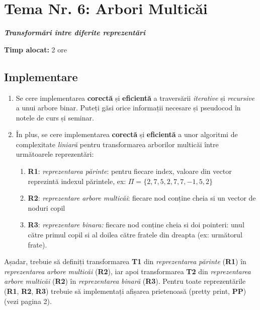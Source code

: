 \documentclass[../ro-fa-lab.tex]{subfiles}
\begin{document}
\section{\texorpdfstring{\textbf{Tema Nr. 6: Arbori Multicăi}}{Tema Nr. 6: Arbori Multicăi}}\label{assign6}


\emph{\textbf{Transformări între diferite reprezentări}}

\textbf{Timp alocat:} 2 ore

\subsection{Implementare}\label{implementare}

\begin{enumerate}
\def\labelenumi{\arabic{enumi}.}
\item
  Se cere implementarea \textbf{corectă} și \textbf{eficientă} a
  traversării \emph{iterative} și \emph{recursive} a unui arbore binar.
  Puteți găsi orice informații necesare și pseudocod în notele de curs
  și seminar.
\item
  În plus, se cere implementarea \textbf{corectă} și \textbf{eficientă}
  a unor algoritmi de complexitate \emph{liniară} pentru transformarea
  arborilor multicăi între următoarele reprezentări:

  \begin{enumerate}
  \def\labelenumii{\arabic{enumii}.}
  \item
    \textbf{R1}: \emph{reprezentarea părinte}: pentru fiecare index,
    valoare din vector reprezintă indexul părintele, ex:
    \(\Pi = \{ 2,7,5,2,7,7, - 1,5,2\}\)
  \item
    \textbf{R2}: \emph{reprezentare arbore multicăi}: fiecare nod
    conține cheia si un vector de noduri copil
  \item
    \textbf{R3}: \emph{reprezentare binara:} fiecare nod conține cheia
    si doi pointeri: unul către primul copil si al doilea către fratele
    din dreapta (ex: următorul frate).
  \end{enumerate}
\end{enumerate}

Așadar, trebuie să definiți transformarea \textbf{T1} din
\emph{reprezentarea} \emph{părinte} (\textbf{R1}) în
\emph{reprezentarea} \emph{arbore multicăi} (\textbf{R2}), iar apoi
transformarea \textbf{T2} din \emph{reprezentarea} \emph{arbore
multicăi} (\textbf{R2}) în \emph{reprezentarea} \emph{binară}
(\textbf{R3}). Pentru toate reprezentările (\textbf{R1}, \textbf{R2},
\textbf{R3}) trebuie să implementați afișarea prietenoasă (pretty print,
\textbf{PP}) (vezi pagina 2).
\end{document}
